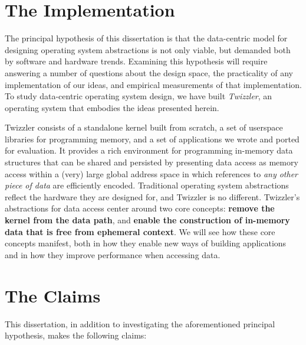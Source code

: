 \section*{The Implementation}

The principal hypothesis of this dissertation is that the data-centric model for designing operating system abstractions
is not only viable, but demanded both by software and hardware trends. Examining this hypothesis will require answering
a number of questions about the design space, the practicality of any implementation of our ideas, and empirical
measurements of that implementation. To study data-centric operating system design, we have built \emph{Twizzler}, an
operating system that embodies the ideas presented herein.

Twizzler consists of a standalone kernel built from scratch, a set of userspace libraries for programming memory, and a
set of applications we wrote and ported for evaluation. It provides a rich environment for programming in-memory data
structures that can be shared and persisted by presenting data access as memory access within a (very) large global
address space in which references to \emph{any other piece of data} are efficiently encoded. Traditional operating
system abstractions reflect the hardware they are designed for, and Twizzler is no different. Twizzler's abstractions
for data access center around two core concepts: \textbf{remove the kernel from the data path}, and \textbf{enable the
    construction of in-memory data that is free from ephemeral context}. We will see how these core concepts manifest, both
in how they enable new ways of building applications and in how they improve performance when accessing data.

\section*{The Claims}

This dissertation, in addition to investigating the aforementioned principal hypothesis, makes the following claims:

